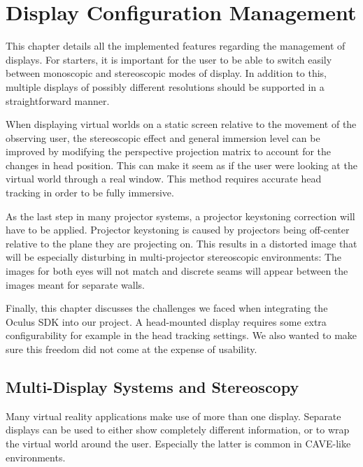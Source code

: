 \documentclass[12pt,a4paper,oneside,pdftex]{report}
\begin{document}


\chapter{Display Configuration Management}
\label{chapter:displayconfigurationmanagement}

This chapter details all the implemented features regarding the management of displays. For starters, it is important for the user to be able to switch easily between monoscopic and stereoscopic modes of display. In addition to this, multiple displays of possibly different resolutions should be supported in a straightforward manner.

When displaying virtual worlds on a static screen relative to the movement of the observing user, the stereoscopic effect and general immersion level can be improved by modifying the perspective projection matrix to account for the changes in head position. This can make it seem as if the user were looking at the virtual world through a real window. This method requires accurate head tracking in order to be fully immersive.

As the last step in many projector systems, a projector keystoning correction will have to be applied. Projector keystoning is caused by projectors being off-center relative to the plane they are projecting on. This results in a distorted image that will be especially disturbing in multi-projector stereoscopic environments: The images for both eyes will not match and discrete seams will appear between the images meant for separate walls.

Finally, this chapter discusses the challenges we faced when integrating the Oculus SDK into our project. A head-mounted display requires some extra configurability for example in the head tracking settings. We also wanted to make sure this freedom did not come at the expense of usability.

\section{Multi-Display Systems and Stereoscopy}
\label{section:multidisplaysystems}

Many virtual reality applications make use of more than one display. Separate displays can be used to either show completely different information, or to wrap the virtual world around the user. Especially the latter is common in CAVE-like environments.
\end{document}

